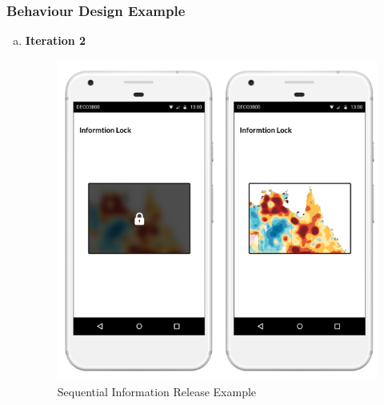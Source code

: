     \subsubsection{Behaviour Design Example}
      \begin{enumerate}[a)]
        \item \textbf{Iteration 2}
          \begin{figure}[H]
            \centering
            \includegraphics[scale=1]{img/digital-prototype/info-lock-screen.png}
            \caption{Sequential Information Release Example}
            \label{fig:digi-proto-03}
          \end{figure}
      \end{enumerate}

